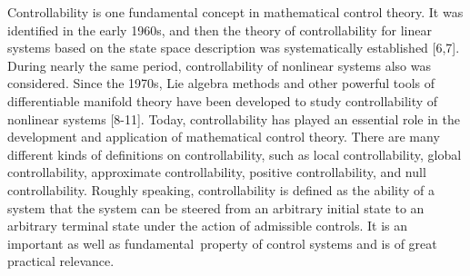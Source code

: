 \documentclass[journal,a4paper,12pt,onecolumn]{IEEEtran}
\begin{document}
$\left. {}\right. $

Controllability is one fundamental concept in mathematical control theory.
It was identified in the early 1960s, and then the theory of controllability
for linear systems based on the state space description was systematically
established [6,7]. During nearly the same period, controllability of
nonlinear systems also was considered. Since the 1970s, Lie algebra methods
and other powerful tools of differentiable manifold theory have been
developed to study controllability of nonlinear systems [8-11]. Today,
controllability has played an essential role in the development and
application of mathematical control theory. There are many different kinds
of definitions on controllability, such as local controllability, global
controllability, approximate controllability, positive controllability, and
null controllability. Roughly speaking, controllability is defined as the
ability of a system that the system can be steered from an arbitrary initial
state to an arbitrary terminal state under the action of admissible
controls. It is an important as well as fundamental\ property of control
systems and is of great practical relevance.

$\left. {}\right. $
\end{document}

